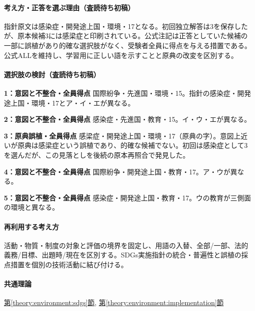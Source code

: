 \paragraph{考え方・正答を選ぶ理由（査読待ち初稿）} 指針原文は感染症・開発途上国・環境・17となる。初回独立解答は3を保存したが、原本候補3には感梁症と印刷されている。公式注記は正答としていた候補の一部に誤植があり的確な選択肢がなく、受験者全員に得点を与える措置である。公式ALLを維持し、学習用に正しい語を示すことと原典の改変を区別する。

\paragraph{選択肢の検討（査読待ち初稿）}\mbox{}\par

\noindent\textbf{1：意図と不整合・全員得点} 国際紛争・先進国・環境・15。指針の感染症・開発途上国・環境・17とア・イ・エが異なる。\par

\noindent\textbf{2：意図と不整合・全員得点} 感染症・先進国・教育・15。イ・ウ・エが異なる。\par

\noindent\textbf{3：原典誤植・全員得点} 感梁症・開発途上国・環境・17（原典の字）。意図上近いが原典は感梁症という誤植であり、的確な候補でない。初回は感染症として3を選んだが、この見落としを後続の原本再照合で発見した。\par

\noindent\textbf{4：意図と不整合・全員得点} 国際紛争・開発途上国・教育・17。ア・ウが異なる。\par

\noindent\textbf{5：意図と不整合・全員得点} 感染症・開発途上国・教育・17。ウの教育が三側面の環境と異なる。\par

\paragraph{再利用する考え方} 活動・物質・制度の対象と評価の境界を固定し、用語の入替、全部/一部、法的義務/目標、出題時/現在を区別する。SDGs実施指針の統合・普遍性と誤植の採点措置を個別の技術活動に結び付ける。

\paragraph{共通理論} \hyperref[theory:environment:sdgs]{第\ref*{theory:environment:sdgs}節}, \hyperref[theory:environment:implementation]{第\ref*{theory:environment:implementation}節}

